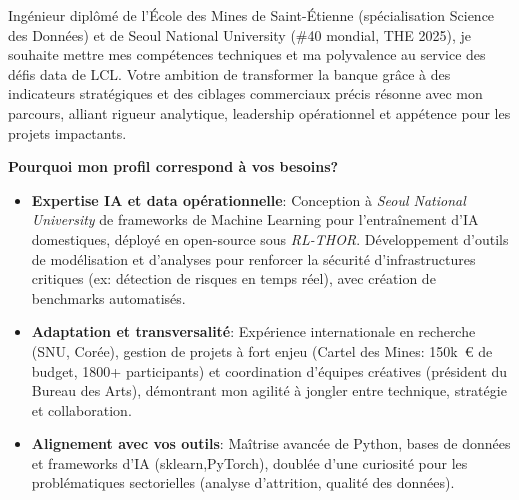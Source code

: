 
\newcommand{\Company}{LCL}
\recipient{\RecruitmentTeam{\Company}}{\Company\\Guyancourt\\ France}
\makelettertitle

Ingénieur diplômé de l'École des Mines de Saint-Étienne (spécialisation Science des Données) et de Seoul National University (\#40 mondial, THE 2025), je souhaite mettre mes compétences techniques et ma polyvalence au service des défis data de LCL\@.
Votre ambition de transformer la banque grâce à des indicateurs stratégiques et des ciblages commerciaux précis résonne avec mon parcours, alliant rigueur analytique, leadership opérationnel et appétence pour les projets impactants.

\textbf{Pourquoi mon profil correspond à vos besoins?}
\begin{itemize}
    \item \textbf{Expertise IA et data opérationnelle}:
          Conception à \textit{Seoul National University} de frameworks de Machine Learning pour l'entraînement d'IA domestiques, déployé en open-source sous \textit{RL-THOR}.
          Développement d'outils de modélisation et d'analyses pour renforcer la sécurité d'infrastructures critiques (ex: détection de risques en temps réel), avec création de benchmarks automatisés.
    \item \textbf{Adaptation et transversalité}: Expérience internationale en recherche (SNU, Corée), gestion de projets à fort enjeu (Cartel des Mines: 150k~€ de budget, 1800+ participants) et coordination d'équipes créatives (président du Bureau des Arts), démontrant mon agilité à jongler entre technique, stratégie et collaboration.
    \item \textbf{Alignement avec vos outils}: Maîtrise avancée de Python, bases de données et frameworks d'IA (sklearn,PyTorch), doublée d'une curiosité pour les problématiques sectorielles (analyse d'attrition, qualité des données).
\end{itemize}
\vspace{7pt}

